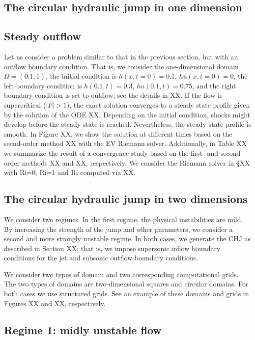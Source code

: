 \documentclass[preprint, 11pt]{article}
\begin{document}
\subsection{The circular hydraulic jump in one dimension}

\subsection{Steady outflow}
Let us consider a problem similar to that in the previous section, but with an outflow boundary condition. 
That is, we consider the one-dimensional domain $\Omega=(0.1,1)$, the initial condition is 
$h(x,t=0)=0.1$, $hu(x,t=0)=0$, the left boundary condition is $h(0.1,t)=0.3$, $hu(0.1,t)=0.75$, 
and the right boundary condition is set to outflow, see the details in XX. 
If the flow is supercritical ($|F|>1$), the exact solution converges to a 
steady state profile given by the solution of the ODE XX. 
Depending on the initial condition, shocks might develop before the steady state is reached. 
Nevertheless, the steady state profile is smooth. 
In Figure XX, we show the solution at different times based on the secnd-order method XX with 
the EV Riemann solver. Additionally, in Table XX we summarize the result of a convergence study 
based on the first- and second-order methods XX and XX, respectively. 
We consider the Riemann solver in \S XX with Ri=0, Ri=1 and Ri computed via XX. 


\subsection{The circular hydraulic jump in two dimensions}
We consider two regimes. In the first regime, the physical instabilities are mild. 
By increasing the strength of the jump and other parameters, we consider a second 
and more strongly unstable regime. In both cases, we generate the CHJ as described in 
Section XX; that is, we impose supersonic inflow boundary conditions for the jet and 
subsonic outflow boundary conditions. 

We consider two types of domain and two corresponding computational grids. 
The two types of domains are two-dimensional squares and circular domains. 
For both cases we use structured grids. See an example of these domains and grids in Figures XX and XX, 
respectively.

\subsection{Regime 1: midly unstable flow}
\end{document}
